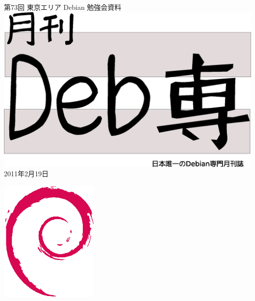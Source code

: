 \documentclass[mingoth,a4paper]{jsarticle}
\newcommand{\debmtgyear}{2011}
\newcommand{\debmtgmonth}{2}
\newcommand{\debmtgdate}{19}
\newcommand{\debmtgnumber}{73}
\begin{document}
\begin{titlepage}
\thispagestyle{empty}

\vspace*{-2cm}
第\debmtgnumber{}回 東京エリア Debian 勉強会資料\\
\hspace*{-2cm}
\includegraphics[width=210mm]{image201003/debsen.eps}\\
\hfill{}\debmtgyear{}年\debmtgmonth{}月\debmtgdate{}日



\vspace*{-2cm}
\hfill{}\includegraphics[height=6cm]{image200502/openlogo-nd.eps}
\end{titlepage}

\end{document}
